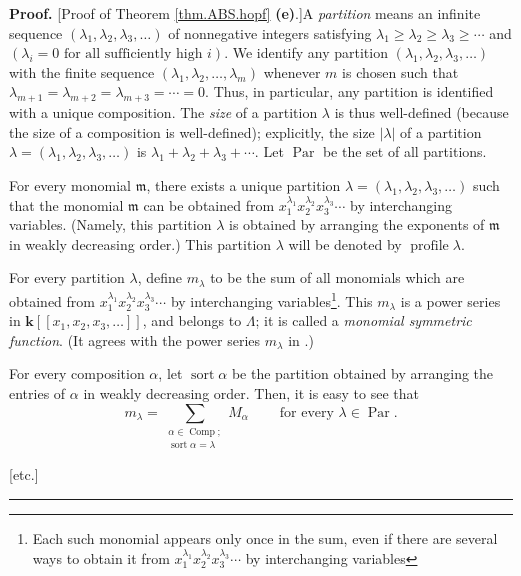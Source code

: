\documentclass[numbers=enddot,12pt,final,onecolumn,notitlepage,abstracton]{scrartcl}%
\theoremstyle{definition}
\newenvironment{proof}[1][Proof]{\noindent\textbf{#1.} }{\ \rule{0.5em}{0.5em}}
\newenvironment{noncompile}{}{}
\let\sumnonlimits\sum
\renewcommand{\sum}{\sumnonlimits\limits}
\begin{document}
\begin{noncompile}
\begin{proof}
[Proof of Theorem \ref{thm.ABS.hopf} \textbf{(e)}.]A \textit{partition} means
an infinite sequence $\left(  \lambda_{1},\lambda_{2},\lambda_{3}%
,\ldots\right)  $ of nonnegative integers satisfying $\lambda_{1}\geq
\lambda_{2}\geq\lambda_{3}\geq\cdots$ and $\left(  \lambda_{i}=0\text{ for all
sufficiently high }i\right)  $. We identify any partition $\left(  \lambda
_{1},\lambda_{2},\lambda_{3},\ldots\right)  $ with the finite sequence
$\left(  \lambda_{1},\lambda_{2},\ldots,\lambda_{m}\right)  $ whenever $m$ is
chosen such that $\lambda_{m+1}=\lambda_{m+2}=\lambda_{m+3}=\cdots=0$. Thus,
in particular, any partition is identified with a unique composition. The
\textit{size} of a partition $\lambda$ is thus well-defined (because the size
of a composition is well-defined); explicitly, the size $\left\vert
\lambda\right\vert $ of a partition $\lambda=\left(  \lambda_{1},\lambda
_{2},\lambda_{3},\ldots\right)  $ is $\lambda_{1}+\lambda_{2}+\lambda
_{3}+\cdots$. Let $\operatorname*{Par}$ be the set of all partitions.

For every monomial $\mathfrak{m}$, there exists a unique partition
$\lambda=\left(  \lambda_{1},\lambda_{2},\lambda_{3},\ldots\right)  $ such
that the monomial $\mathfrak{m}$ can be obtained from $x_{1}^{\lambda_{1}%
}x_{2}^{\lambda_{2}}x_{3}^{\lambda_{3}}\cdots$ by interchanging variables.
(Namely, this partition $\lambda$ is obtained by arranging the exponents of
$\mathfrak{m}$ in weakly decreasing order.) This partition $\lambda$ will be
denoted by $\operatorname*{profile}\lambda$.

For every partition $\lambda$, define $m_{\lambda}$ to be the sum of all
monomials which are obtained from $x_{1}^{\lambda_{1}}x_{2}^{\lambda_{2}}%
x_{3}^{\lambda_{3}}\cdots$ by interchanging variables\footnote{Each such
monomial appears only once in the sum, even if there are several ways to
obtain it from $x_{1}^{\lambda_{1}}x_{2}^{\lambda_{2}}x_{3}^{\lambda_{3}%
}\cdots$ by interchanging variables}. This $m_{\lambda}$ is a power series in
$\mathbf{k}\left[  \left[  x_{1},x_{2},x_{3},\ldots\right]  \right]  $, and
belongs to $\Lambda$; it is called a \textit{monomial symmetric function}. (It
agrees with the power series $m_{\lambda}$ in \cite[(2.1.1)]{Reiner}.)

For every composition $\alpha$, let $\operatorname*{sort}\alpha$ be the
partition obtained by arranging the entries of $\alpha$ in weakly decreasing
order. Then, it is easy to see that%
\begin{equation}
m_{\lambda}=\sum_{\substack{\alpha\in\operatorname*{Comp}%
;\\\operatorname*{sort}\alpha=\lambda}}M_{\alpha}\ \ \ \ \ \ \ \ \ \ \text{for
every }\lambda\in\operatorname*{Par}. \label{pf.thm.ABS.hopf.1}%
\end{equation}


[etc.]
\end{proof}
\end{noncompile}
\end{document}
